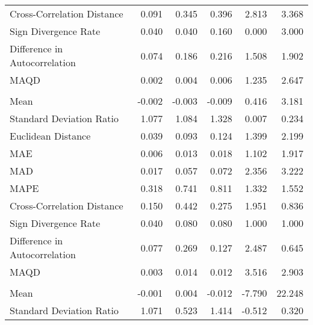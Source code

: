 \begin{landscape}
\begin{ThreePartTable}
\begin{longtable}[t]{lrrrrr}
\hspace{1em}Cross-Correlation Distance & 0.091 & 0.345 & 0.396 & 2.813 & 3.368\\
\hspace{1em}Sign Divergence Rate & 0.040 & 0.040 & 0.160 & 0.000 & 3.000\\
\hspace{1em}Difference in Autocorrelation & 0.074 & 0.186 & 0.216 & 1.508 & 1.902\\
\hspace{1em}MAQD & 0.002 & 0.004 & 0.006 & 1.235 & 2.647\\
\addlinespace[0.5em]
\multicolumn{6}{l}{\textbf{SAU}}\\
\hline
\hspace{1em}Mean & -0.002 & -0.003 & -0.009 & 0.416 & 3.181\\
\hspace{1em}Standard Deviation Ratio & 1.077 & 1.084 & 1.328 & 0.007 & 0.234\\
\hspace{1em}Euclidean Distance & 0.039 & 0.093 & 0.124 & 1.399 & 2.199\\
\hspace{1em}MAE & 0.006 & 0.013 & 0.018 & 1.102 & 1.917\\
\hspace{1em}MAD & 0.017 & 0.057 & 0.072 & 2.356 & 3.222\\
\hspace{1em}MAPE & 0.318 & 0.741 & 0.811 & 1.332 & 1.552\\
\hspace{1em}Cross-Correlation Distance & 0.150 & 0.442 & 0.275 & 1.951 & 0.836\\
\hspace{1em}Sign Divergence Rate & 0.040 & 0.080 & 0.080 & 1.000 & 1.000\\
\hspace{1em}Difference in Autocorrelation & 0.077 & 0.269 & 0.127 & 2.487 & 0.645\\
\hspace{1em}MAQD & 0.003 & 0.014 & 0.012 & 3.516 & 2.903\\
\addlinespace[0.5em]
\multicolumn{6}{l}{\textbf{SEN}}\\
\hline
\hspace{1em}Mean & -0.001 & 0.004 & -0.012 & -7.790 & 22.248\\
\hspace{1em}Standard Deviation Ratio & 1.071 & 0.523 & 1.414 & -0.512 & 0.320\\

\end{longtable}
\end{ThreePartTable}
\end{landscape}
